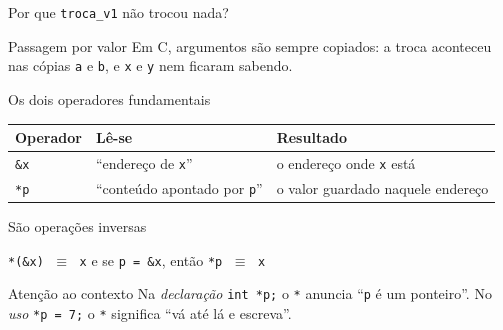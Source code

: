 \documentclass[aspectratio=169]{beamer}
\begin{document}
\begin{frame}{Por que \texttt{troca\_v1} não trocou nada?}
  \begin{center}
  \end{center}
  \begin{alertblock}{Passagem por valor}
    Em C, argumentos são sempre copiados: a troca aconteceu nas cópias
    \texttt{a} e \texttt{b}, e \texttt{x} e \texttt{y} nem ficaram sabendo.
  \end{alertblock}
\end{frame}

\begin{frame}{Os dois operadores fundamentais}
  \begin{center}
  \small
  \begin{tabular}{lll}
    \toprule
    Operador & Lê-se & Resultado \\
    \midrule
    \texttt{\&x} & ``endereço de \texttt{x}'' & o endereço onde \texttt{x} está \\
    \texttt{*p}  & ``conteúdo apontado por \texttt{p}'' & o valor guardado naquele endereço \\
    \bottomrule
  \end{tabular}
  \end{center}
  \begin{block}{São operações inversas}
    \begin{center}
      \texttt{*(\&x)} $\;\equiv\;$ \texttt{x} \qquad e \qquad
      se \texttt{p = \&x}, então \texttt{*p} $\;\equiv\;$ \texttt{x}
    \end{center}
  \end{block}
  \begin{exampleblock}{Atenção ao contexto}
    Na \emph{declaração} \texttt{int *p;} o \texttt{*} anuncia ``\texttt{p} é
    um ponteiro''. No \emph{uso} \texttt{*p = 7;} o \texttt{*} significa
    ``vá até lá e escreva''.
  \end{exampleblock}
\end{frame}
\end{document}
